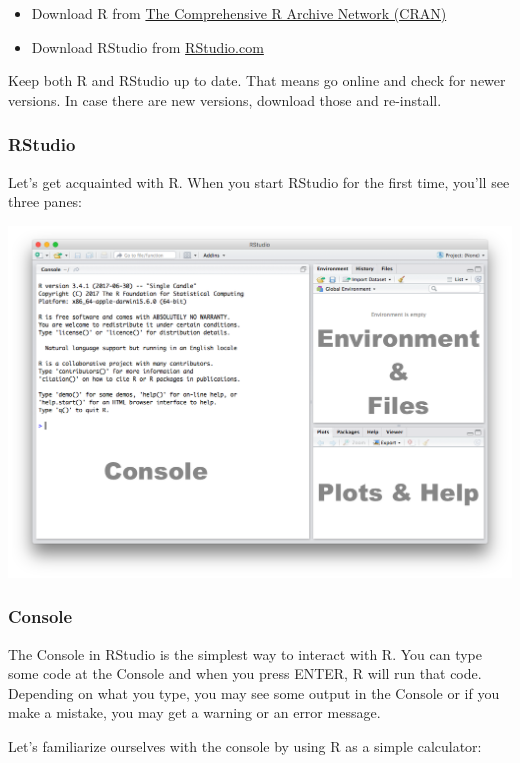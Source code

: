 \documentclass[]{article}
\providecommand{\tightlist}{%
  \setlength{\itemsep}{0pt}\setlength{\parskip}{0pt}}
\begin{document}
\begin{itemize}
\tightlist
\item
  Download R from \href{https://cran.r-project.org}{The Comprehensive R Archive Network (CRAN)}
\item
  Download RStudio from \href{https://www.rstudio.com}{RStudio.com}
\end{itemize}

Keep both R and RStudio up to date. That means go online and check for newer versions. In case there are new versions, download those and re-install.

\hypertarget{rstudio}{%
\subsubsection{RStudio}\label{rstudio}}

Let's get acquainted with R. When you start RStudio for the first time, you'll see three panes:

\includegraphics{./img/rstudio_default.png}

\hypertarget{console}{%
\subsubsection{Console}\label{console}}

The Console in RStudio is the simplest way to interact with R. You can type some code at the Console and when you press ENTER, R will run that code. Depending on what you type, you may see some output in the Console or if you make a mistake, you may get a warning or an error message.

Let's familiarize ourselves with the console by using R as a simple calculator:
\end{document}
